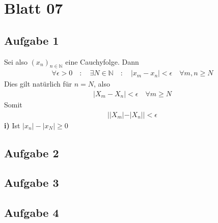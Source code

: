 \chapter{Blatt 07}
\section{Aufgabe 1}
Sei also $(x_n)_{n\in \mathbb{N}}$ eine Cauchyfolge. Dann
\begin{align}
  \forall\epsilon > 0\quad :\quad \exists N \in \mathbb{N}\quad :\quad |x_m - x_n|<\epsilon \quad \forall m,n \geq N
\end{align}
Dies gilt natürlich für $n=N$, also
\begin{align}
  |X_m - X_n|<\epsilon \quad \forall m \geq N
\end{align}
Somit
\begin{align}
  ||X_m| - |X_n||<\epsilon
\end{align}
\textbf{i)} Ist $|x_n| - |x_N|\geq 0$
\section{Aufgabe 2}
\section{Aufgabe 3}
\section{Aufgabe 4}
